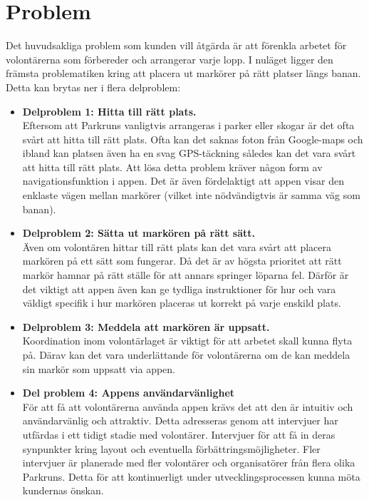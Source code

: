 \section{Problem}
Det huvudsakliga problem som kunden vill åtgärda är att förenkla arbetet för volontärerna som förbereder och arrangerar varje lopp. I nuläget ligger den främsta problematiken kring att placera ut markörer på rätt platser längs banan. Detta kan brytas ner i flera delproblem:
\begin{itemize}
    \item \textbf{Delproblem 1: Hitta till rätt plats.}\\
        Eftersom att Parkruns vanligtvis arrangeras i parker eller skogar är det ofta svårt att hitta till rätt plats. Ofta kan det saknas foton från Google-maps och ibland kan platsen även ha en svag GPS-täckning således kan det vara svårt att hitta till rätt plats. 
        Att lösa detta problem kräver någon form av navigationsfunktion i appen. Det är även fördelaktigt att appen visar den enklaste vägen mellan markörer (vilket inte nödvändigtvis är samma väg som banan).  
    \item \textbf{Delproblem 2: Sätta ut markören på rätt sätt.}\\
        Även om volontären hittar till rätt plats kan det vara svårt att placera markören på ett sätt som fungerar. Då det är av högsta prioritet att rätt markör hamnar på rätt ställe för att annars springer löparna fel. Därför är det viktigt att appen även kan ge tydliga instruktioner för hur och vara väldigt specifik i hur markören placeras ut korrekt på varje enskild plats. 

    \item \textbf{Delproblem 3: Meddela att markören är uppsatt.}\\
        Koordination inom volontärlaget är viktigt för att arbetet skall kunna flyta på. Därav kan det vara underlättande för volontärerna om de kan meddela sin markör som uppsatt via appen.

    \item \textbf{Del problem 4: Appens användarvänlighet} \\
    För att få att volontärerna använda  appen krävs det att den är intuitiv och användarvänlig och attraktiv. Detta adresseras genom att intervjuer har utfärdas i ett tidigt stadie med volontärer. Intervjuer för att få in deras synpunkter kring layout och eventuella förbättringsmöjligheter. Fler intervjuer är planerade med fler volontärer och organisatörer från flera olika Parkruns. Detta för att kontinuerligt under utvecklingsprocessen kunna möta kundernas önskan.


\end{itemize}
